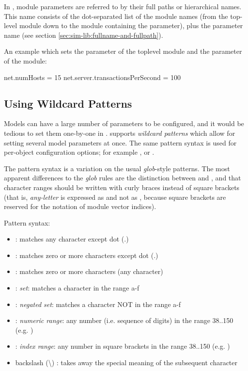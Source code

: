 In , module parameters are referred to by their full paths
or hierarchical names. This name consists of the dot-separated list of
the module names (from the top-level module down to the module containing
the parameter), plus the parameter name
(see section \ref{sec:sim-lib:fullname-and-fullpath}).

An example  which sets the  parameter of
the toplevel module and the  parameter of the
 module:

\begin{inifile}
[General]
net.numHosts = 15
net.server.transactionsPerSecond = 100
\end{inifile}


\subsection{Using Wildcard Patterns}
\label{sec:ch-config-sim:wildcards}

Models can have a large number of parameters to be configured, and it would
be tedious to set them one-by-one in . {\opp} supports
\textit{wildcard patterns} which allow for setting several model parameters
at once. The same pattern syntax is used for per-object configuration options;
for example , or .

The pattern syntax is a variation on the usual \textit{glob}-style
patterns. The most apparent differences to the \textit{glob} rules are the
distinction between \ttt{*} and \ttt{**}, and that character ranges should
be written with curly braces instead of square brackets (that is,
\textit{any-letter} is expressed as  and not as
\ttt{[a-zA-Z]}, because square brackets are reserved for the notation of
module vector indices).

Pattern syntax:

\begin{itemize}
  \item {} : matches any character except dot (.)
  \item \ttt{*} : matches zero or more characters except dot (.)
  \item \ttt{**} : matches zero or more characters (any character)
  \item {} : \textit{set}: matches a character in the range a-f
  \item {}: \textit{negated set}: matches a character
    NOT in the range a-f
  \item {} : \textit{numeric range}: any number (i.e. sequence of digits)
    in the range 38..150  (e.g. )
  \item \ttt{[38..150]} : \textit{index range}: any number in square brackets in the
    range 38..150 (e.g. \ttt{[99]})
  \item backslash ({\textbackslash}) : takes away the special meaning of the
    subsequent character
\end{itemize}

